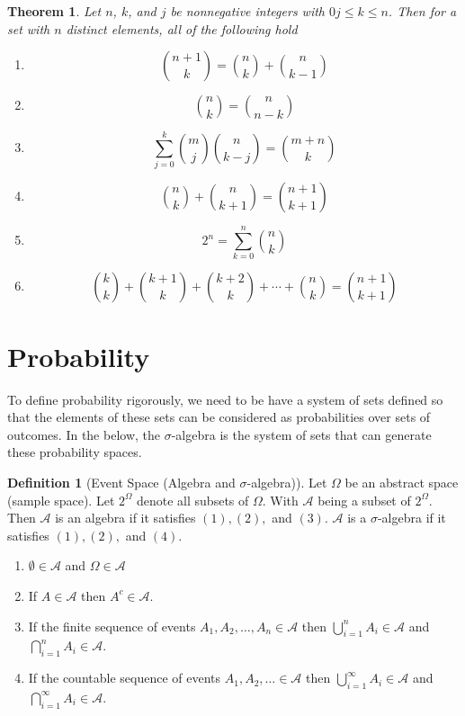 \documentclass{article}
\newtheorem{theorem}{Theorem}[section]
\theoremstyle{definition}
\newtheorem{definition}{Definition}[section]
\theoremstyle{remark}
\begin{document}
\begin{theorem}
Let $n$, $k$, and $j$ be nonnegative integers with $0j\leq k \leq n$. 
Then for a set with $n$ distinct elements, all of the following hold
\begin{enumerate}
\item \[\binom{n+1}{k} = \binom{n}{k} + \binom{n}{k-1}\]
\item \[\binom{n}{k} = \binom{n}{n-k}\]
\item \[\sum^k_{j=0}{\binom{m}{j}\binom{n}{k-j}} = \binom{m+n}{k}\]
\item \[\binom{n}{k} + \binom{n}{k+1} = \binom{n+1}{k+1}\]
\item \[2^n = \sum^n_{k=0}{\binom{n}{k}}\]
\item \[\binom{k}{k}+ \binom{k+1}{k} + \binom{k+2}{k} + \cdots +\binom{n}{k} = \binom{n+1}{k+1}   \]
\end{enumerate}
\end{theorem}




\section{Probability}
To define probability rigorously, we need to 
be have a system of sets defined so that the elements 
of these sets can be considered as probabilities over 
sets of outcomes. In the below, the $\sigma$-algebra 
is the system of sets that can generate these probability spaces.

\vspace{.5cm}

\begin{definition}[Event Space (Algebra and $\sigma$-algebra)]\label{def:sigma algebra}
Let $\Omega$ be an abstract space (sample space). Let $2^{\Omega}$ denote all subsets of $\Omega$. With $\mathcal{A}$ being a subset of $2^\Omega$. Then $\mathcal{A}$ is an algebra if it satisfies $(1),(2),$ and $(3)$. $\mathcal{A}$ is a $\sigma$-algebra if it satisfies $(1), (2),$ and $(4)$.
\begin{enumerate}
\item $\emptyset \in \mathcal{A}$ and $\Omega \in \mathcal{A}$
\item If $ A \in \mathcal{A}$ then $A^c \in \mathcal{A}$.
\item If the finite sequence of events $A_1, A_2, \dots ,A_n \in \mathcal{A}$ then $\bigcup^n_{i=1}{A_i} \in \mathcal{A}$ and $\bigcap^n_{i=1}{A_i} \in \mathcal{A}$.
\item If the countable sequence of events $A_1, A_2, \dots \in \mathcal{A}$ then $\bigcup^\infty_{i=1}{A_i} \in \mathcal{A}$ and $ \bigcap^\infty_{i=1}{A_i} \in \mathcal{A}    $. 
\end{enumerate}

\end{definition}
\end{document}
